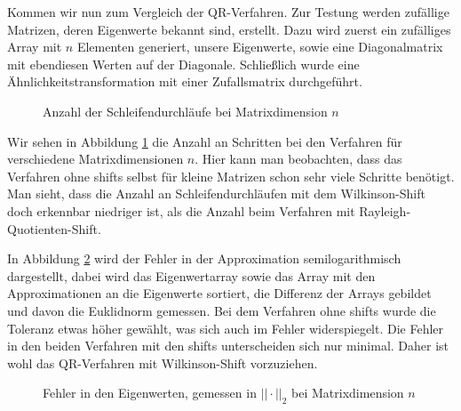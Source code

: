 \documentclass{article}
\begin{document}
Kommen wir nun zum Vergleich der QR-Verfahren. Zur Testung werden zufällige Matrizen, deren Eigenwerte bekannt sind, erstellt. Dazu wird zuerst ein zufälliges Array mit $n$ Elementen generiert, unsere Eigenwerte, sowie eine Diagonalmatrix mit ebendiesen Werten auf der Diagonale. Schließlich wurde eine Ähnlichkeitstransformation mit einer Zufallsmatrix durchgeführt.

\begin{figure}[H]
  \centering
  \qquad
  \caption{Anzahl der Schleifendurchläufe bei Matrixdimension $n$}%
  \label{Schleifendurchläufe}
\end{figure}

Wir sehen in Abbildung \ref{Schleifendurchläufe} die Anzahl an Schritten bei den Verfahren für verschiedene Matrixdimensionen $n$. Hier kann man beobachten, dass das Verfahren ohne shifts selbst für kleine Matrizen schon sehr viele Schritte benötigt.  Man sieht, dass die Anzahl an Schleifendurchläufen mit dem Wilkinson-Shift doch erkennbar niedriger ist, als die Anzahl beim Verfahren mit Rayleigh-Quotienten-Shift.

In Abbildung \ref{Error_QR} wird der Fehler in der Approximation semilogarithmisch dargestellt, dabei wird das Eigenwertarray sowie das Array mit den Approximationen an die Eigenwerte sortiert, die Differenz der Arrays gebildet und davon die Euklidnorm gemessen. Bei dem Verfahren ohne shifts wurde die Toleranz etwas höher gewählt, was sich auch im Fehler widerspiegelt. Die Fehler in den beiden Verfahren mit den shifts unterscheiden sich nur minimal. Daher ist wohl das QR-Verfahren mit Wilkinson-Shift vorzuziehen.


\begin{figure}[H]
  \centering
  \qquad
  \caption{Fehler in den Eigenwerten, gemessen in $||\cdot||_2$ bei Matrixdimension $n$}%
  \label{Error_QR}
\end{figure}
\end{document}
